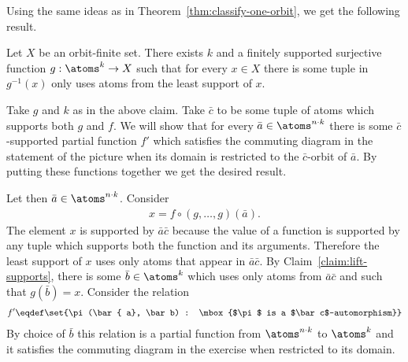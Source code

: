 {Using the same ideas as in Theorem~\ref{thm:classify-one-orbit}, we get the following result.


\begin{claim}\label{claim:lift-supports} Let $X$ be an orbit-finite set. There exists $k$ and a finitely supported surjective function $g : \atoms^k \to X$ such that for every $x \in X$ there is some tuple in $g^{-1}(x)$ only uses atoms from the least support of $x$.
\end{claim}
	

Take $g$ and $k$ as in the above claim. Take $\bar c$ to be some tuple of atoms which supports both $g$ and $f$. We will show that for every $\bar a \in \atoms ^{n \cdot k}$ there is some $\bar c$-supported partial function $f'$ which satisfies the commuting diagram in the statement of the picture when its domain is restricted to the $\bar c$-orbit of $\bar a$. By putting these functions together we get the desired result. 
 
 
Let then $\bar a \in \atoms^{n \cdot k}$. Consider
\begin{align*}
 x = f \circ (g,\ldots,g) (\bar a).
\end{align*}
The element $x$ is supported by $\bar a \bar c$ because the value of a function is supported by any tuple which supports both the function and its arguments. Therefore the least support of $x$ uses only atoms that appear in $\bar a \bar c$. By Claim~\ref{claim:lift-supports}, there is some $\bar b \in \atoms^k$ which uses only atoms from $ \bar a \bar c$ and such that $g(\bar b) = x.$ Consider the relation
\begin{align*}
 f' \eqdef \set{\pi(\bar { a}, \bar b) : \mbox{$\pi$ is a $\bar c$-automorphism}}
\end{align*}
By choice of $\bar b$ this relation is a partial function from $\atoms^{n \cdot k}$ to $\atoms^k$ and it satisfies the commuting diagram in the exercise when restricted to its domain. }




